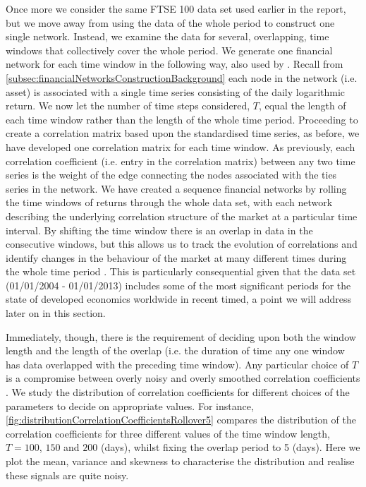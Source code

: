Once more we consider the same FTSE 100 data set used earlier in the report, but we move away from using the data of the whole period to construct one single network.
Instead, we examine the data for several, overlapping, time windows that collectively cover the whole period.
We generate one financial network for each time window in the following way, also used by \cite{OCK+02,OKK03,BD10,FPM+10,FPW+11}.
Recall from \cref{subsec:financialNetworksConstructionBackground} each node in the network (i.e. asset) is associated with a single time series consisting of the daily logarithmic return.
We now let the number of time steps considered, $T$, equal the length of each time window rather than the length of the whole time period.
Proceeding to create a correlation matrix based upon the standardised time series, as before, we have developed one correlation matrix for each time window.
As previously, each correlation coefficient (i.e. entry in the correlation matrix) between any two time series is the weight of the edge connecting the nodes associated with the ties series in the network.
We have created a sequence financial networks by rolling the time windows of returns through the whole data set, with each network describing the underlying correlation structure of the market at a particular time interval.
By shifting the time window there is an overlap in data in the consecutive windows, but this allows us to track the evolution of correlations and identify changes in the behaviour of the market at many different times during the whole time period \cite{FPW+11}.
This is particularly consequential given that the data set (01/01/2004 - 01/01/2013) includes some of the most significant periods for the state of developed economics worldwide in recent timed, a point we will address later on in this section.

Immediately, though, there is the requirement of deciding upon both the window length and the length of the overlap (i.e. the duration of time any one window has data overlapped with the preceding time window).
Any particular choice of $T$ is a compromise between overly noisy and overly smoothed correlation coefficients \cite{OCK+02,FPW+11}.
We study the distribution of correlation coefficients for different choices of the parameters to decide on appropriate values.
For instance, \cref{fig:distributionCorrelationCoefficientsRollover5} compares the distribution of the correlation coefficients for three different values of the time window length, $T=100$, $150$ and $200$ (days), whilst fixing the overlap period to 5 (days).
Here we plot the mean, variance and skewness to characterise the distribution and realise these signals are quite noisy.

